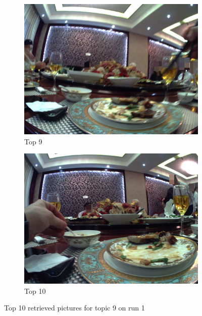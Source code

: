 \begin{figure}[H]
\begin{subfigure}{0.32\textwidth}
    \includegraphics[width=\textwidth]{Sections/7Results/images/top9.jpg}\hfill
    \caption{Top 9}
  \end{subfigure} \par\medskip

  \begin{subfigure}{0.32\textwidth}
    \includegraphics[width=\textwidth]{Sections/7Results/images/top10.jpg}\hfill
    \caption{Top 10}
  \end{subfigure}
  
  \caption{Top 10 retrieved pictures for topic 9 on run 1}
  \label{fig:run1}
\end{figure}




